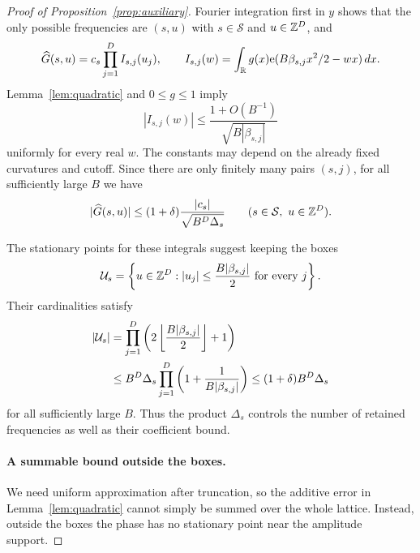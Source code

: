 \begin{proof}[Proof of Proposition~\ref{prop:auxiliary}]
Fourier integration first in $y$ shows that the only possible
frequencies are $(s,u)$ with $s\in\mathcal S$ and $u\in\mathbb Z^D$, and
\begin{equation}
 \label{eq:spread-coefficients}
 \widehat G(s,u)=c_s\prod_{j=1}^DI_{s,j}(u_j),
 \qquad
 I_{s,j}(w)=\int_{\mathbb R}g(x)\mathrm e(B\beta_{s,j}x^2/2-wx)\,dx.
\end{equation}
Lemma~\ref{lem:quadratic} and $0\le g\le1$ imply
\[
 |I_{s,j}(w)|\le
 \frac{1+O(B^{-1})}{\sqrt{B|\beta_{s,j}|}}
\]
uniformly for every real $w$.  The constants may depend on the
already fixed curvatures and cutoff.  Since there are only finitely
many pairs $(s,j)$, for all sufficiently large $B$ we have
\begin{equation}
 \label{eq:spread-coefficient-bound}
 |\widehat G(s,u)|\le
 (1+\delta)\frac{|c_s|}{\sqrt{B^D\Delta_s}}
 \qquad(s\in\mathcal S,\ u\in\mathbb Z^D).
\end{equation}

The stationary points for these integrals suggest keeping the boxes
\[
 \mathcal U_s=
 \left\{u\in\mathbb Z^D: |u_j|\le\frac{B|\beta_{s,j}|}{2}
       \text{ for every }j\right\}.
\]
Their cardinalities satisfy
\begin{align}
 |\mathcal U_s|
 &=\prod_{j=1}^D\left(2\left\lfloor
                  \frac{B|\beta_{s,j}|}{2}\right\rfloor+1\right)
 \notag\\
 &\le B^D\Delta_s\prod_{j=1}^D
       \left(1+\frac1{B|\beta_{s,j}|}\right)
 \le(1+\delta)B^D\Delta_s
 \label{eq:spread-box-count}
\end{align}
for all sufficiently large $B$.  Thus the product $\Delta_s$ controls
the number of retained frequencies as well as their coefficient bound.

\paragraph{A summable bound outside the boxes.}
We need uniform approximation after truncation, so the additive error
in Lemma~\ref{lem:quadratic} cannot simply be summed over the whole
lattice.  Instead, outside the boxes the phase has no stationary
point near the amplitude support.


\end{proof}
